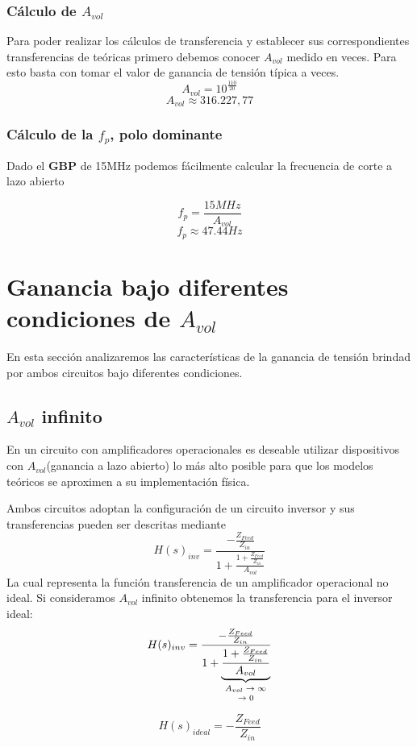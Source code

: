 \documentclass[a4paper]{article}
\begin{document}
 \subsubsection{Cálculo de $A_{vol}$}
Para poder realizar los cálculos de transferencia y establecer sus correspondientes transferencias de teóricas primero debemos conocer $A_{vol}$ medido en veces. Para esto basta con tomar el valor de ganancia de tensión típica a veces.
$$A_{vol} = 10^{\frac{110}{20}}$$
$$A_{vol} \approx 316.227,77$$

\subsubsection{Cálculo de  la $f_p$, polo dominante}

Dado el \textbf{GBP} de 15MHz podemos fácilmente calcular la frecuencia de corte a lazo abierto

$$ f_p = \frac{15MHz}{A_{vol}} $$
$$ f_p \approx 47.44Hz$$

\section{Ganancia bajo diferentes condiciones de $A_{vol}$}
En esta sección analizaremos las características de la ganancia de tensión brindad por ambos circuitos bajo diferentes condiciones.

\subsection{$A_{vol}$ infinito}
En un circuito con amplificadores operacionales es deseable utilizar dispositivos con $A_{vol}$(ganancia a lazo abierto) lo más alto posible para que los modelos teóricos se aproximen a su implementación física.

Ambos circuitos adoptan la configuración de un circuito inversor y sus transferencias pueden ser descritas mediante
$$H(s)_{inv} = \frac{-\frac{Z_{Feed}}{Z_{in}}}
{1+\frac{1+\frac{Z_{Feed}}{Z_{in}}}{A_{vol}}} $$
La cual representa la función transferencia de un amplificador operacional no ideal.
Si consideramos $A_{vol}$ infinito obtenemos la transferencia para el inversor ideal:
$$H(s)_{inv} = \frac{-\frac{Z_{Feed}}{Z_{in}}}
				{1+\underbrace{\frac{1+\frac{Z_{Feed}}{Z_{in}}}{A_{vol}}}_{\text{\shortstack{$A_{vol}\rightarrow \infty$ \\ $\rightarrow 0$}}}}$$

$$H(s)_{ideal} =  -\frac{Z_{Feed}}{Z_{in}}$$
\end{document}
